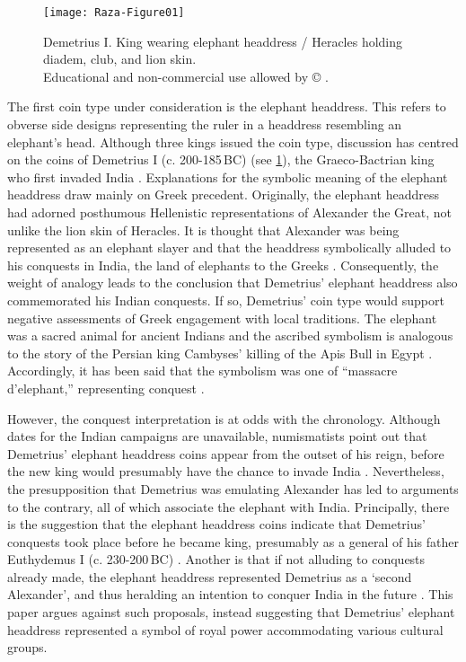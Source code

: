 \documentclass{ijsra}
\renewcommand\BC{{\,BC\xspace}}
\def\coinindia{Educational and non-commercial use allowed by © \cite{Coin}.}
\begin{document}
\begin{figure}[!htb] %
	\centering
	\texttt{[image: Raza-Figure01]}
	\caption{Demetrius I. King wearing elephant headdress / Heracles holding diadem, club, and lion skin.
		{\normalfont\scriptsize \\ \coinindia}}
	\label{fig:Raza-Figure01}
\end{figure}

The first coin type under consideration is the elephant headdress.
This refers to obverse side designs representing the ruler in a headdress resembling an elephant's head.
Although three kings issued the coin type, discussion has centred on the coins of Demetrius I
(c. 200-185\BC) (see \cref{fig:Raza-Figure01}), the Graeco-Bactrian king who first invaded India \parencites[47--48]{Bopearachchi2011}[17--18]{Kalita1997}.
Explanations for the symbolic meaning of the elephant headdress draw mainly on Greek precedent. Originally, the elephant headdress had adorned posthumous Hellenistic representations of Alexander the Great, not unlike the lion skin of Heracles. It is thought that Alexander was being represented as an elephant slayer and that the headdress symbolically alluded to his conquests in India, the land of elephants to the Greeks \parencites[50]{Curtis2007}[335]{Green1993}[104--105]{MacDowall2007a}.
Consequently, the weight of analogy leads to the conclusion that Demetrius’ elephant headdress also commemorated his Indian conquests. If so, Demetrius’ coin type would support negative assessments of Greek engagement with local traditions. The elephant was a sacred animal for ancient Indians and the ascribed symbolism is analogous to the story of the Persian king Cambyses’ killing of the Apis Bull in Egypt \parencite[11--19]{Gupta1983}. Accordingly, it has been said that the symbolism was one of “massacre d’elephant,” representing conquest \parencite[492]{Widemann2009}.

However, the conquest interpretation is at odds with the chronology. Although dates for the Indian campaigns are unavailable, numismatists point out that Demetrius’ elephant headdress coins appear from the outset of his reign, before the new king would presumably have the chance to invade India \parencite[157]{Holt2012}.
Nevertheless, the presupposition that Demetrius was emulating Alexander has led to arguments to the contrary, all of which associate the elephant with India.
Principally, there is the suggestion that the elephant headdress coins indicate that Demetrius’ conquests took place before he became king, presumably as a general of his father Euthydemus I (c. 230-200\BC) \parencite[157]{Holt2012}.
Another is that if not alluding to conquests already made, the elephant headdress represented Demetrius as a ‘second Alexander’, and thus heralding an intention to conquer India in the future \parencites[190]{Sidky2000}[132]{Tarn1951}.
This paper argues against such proposals, instead suggesting that Demetrius’ elephant headdress represented a symbol of royal power accommodating various cultural groups.
\end{document}
